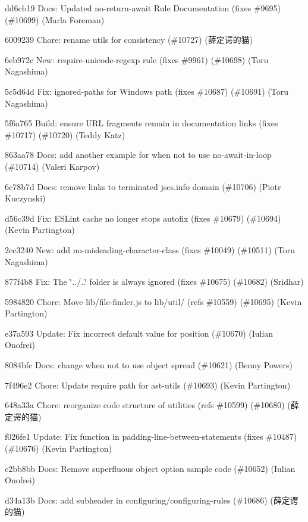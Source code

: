 \begin{DoxyItemize}
\item dd6cb19 Docs\+: Updated no-\/return-\/await Rule Documentation (fixes \#9695) (\#10699) (Marla Foreman)
\item 6009239 Chore\+: rename utils for consistency (\#10727) (薛定谔的猫)
\item 6eb972c New\+: require-\/unicode-\/regexp rule (fixes \#9961) (\#10698) (Toru Nagashima)
\item 5c5d64d Fix\+: ignored-\/paths for Windows path (fixes \#10687) (\#10691) (Toru Nagashima)
\item 5f6a765 Build\+: ensure U\+RL fragments remain in documentation links (fixes \#10717) (\#10720) (Teddy Katz)
\item 863aa78 Docs\+: add another example for when not to use no-\/await-\/in-\/loop (\#10714) (Valeri Karpov)
\item 6e78b7d Docs\+: remove links to terminated jscs.\+info domain (\#10706) (Piotr Kuczynski)
\item d56c39d Fix\+: E\+S\+Lint cache no longer stops autofix (fixes \#10679) (\#10694) (Kevin Partington)
\item 2cc3240 New\+: add no-\/misleading-\/character-\/class (fixes \#10049) (\#10511) (Toru Nagashima)
\item 877f4b8 Fix\+: The \char`\"{}../..\char`\"{} folder is always ignored (fixes \#10675) (\#10682) (Sridhar)
\item 5984820 Chore\+: Move lib/file-\/finder.\+js to lib/util/ (refs \#10559) (\#10695) (Kevin Partington)
\item e37a593 Update\+: Fix incorrect default value for position (\#10670) (Iulian Onofrei)
\item 8084bfc Docs\+: change when not to use object spread (\#10621) (Benny Powers)
\item 7f496e2 Chore\+: Update require path for ast-\/utils (\#10693) (Kevin Partington)
\item 648a33a Chore\+: reorganize code structure of utilities (refs \#10599) (\#10680) (薛定谔的猫)
\item f026fe1 Update\+: Fix \textquotesingle{}function\textquotesingle{} in padding-\/line-\/between-\/statements (fixes \#10487) (\#10676) (Kevin Partington)
\item c2bb8bb Docs\+: Remove superfluous object option sample code (\#10652) (Iulian Onofrei)
\item d34a13b Docs\+: add subheader in configuring/configuring-\/rules (\#10686) (薛定谔的猫)

\end{DoxyItemize}
